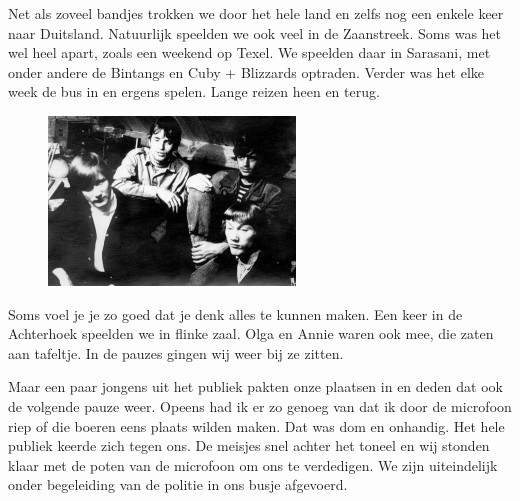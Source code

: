 \documentclass[10pt,twoside, openright]{memoir}
\begin{document}
Net als zoveel bandjes trokken we door het hele land en zelfs nog een enkele keer naar Duitsland. Natuurlijk speelden we ook veel in de Zaanstreek. Soms was het wel heel apart, zoals een weekend op Texel. We speelden daar in Sarasani, met onder andere de Bintangs en Cuby + Blizzards optraden. Verder was het elke week de bus in en ergens spelen. Lange reizen heen en terug.

\begin{figure}
\includegraphics[width=\textwidth]{img/ch30/optournee2a}
\end{figure}

Soms voel je je zo goed dat je denk alles te kunnen maken. Een keer in de Achterhoek speelden we in flinke zaal. Olga en Annie waren ook mee, die zaten aan tafeltje. In de pauzes gingen wij weer bij ze zitten. 

Maar een paar jongens uit het publiek pakten onze plaatsen in en deden dat ook de volgende pauze weer. Opeens had ik er zo genoeg van dat ik door de microfoon riep of die boeren eens plaats wilden maken. Dat was dom en onhandig. Het hele publiek keerde zich tegen ons. De meisjes snel achter het toneel en wij stonden klaar met de poten van de microfoon om ons te verdedigen. We zijn uiteindelijk onder begeleiding van de politie in ons busje afgevoerd.
\end{document}
